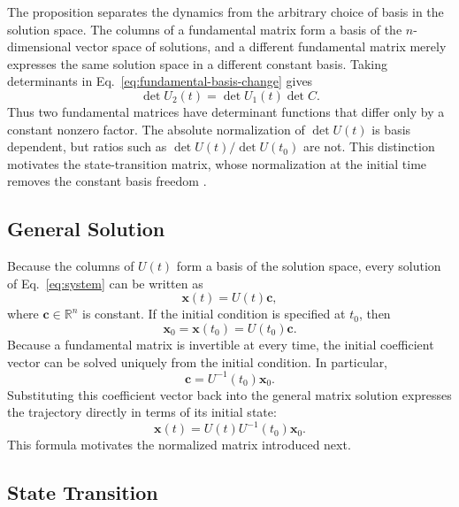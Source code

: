 \documentclass[11pt,a4paper]{article}
\newcommand{\be}{\begin{equation}}
\newcommand{\ee}{\end{equation}}
\newcommand{\lb}[1]{\label{#1}}
\newcommand{\R}{\mathbb{R}}
\theoremstyle{definition}
\numberwithin{equation}{section}
\begin{document}
The proposition separates the dynamics from the arbitrary choice of basis in the solution space. The columns of a fundamental matrix form a basis of the $n$-dimensional vector space of solutions, and a different fundamental matrix merely expresses the same solution space in a different constant basis. Taking determinants in Eq.~\eqref{eq:fundamental-basis-change} gives
\be
\det U_2(t)=\det U_1(t)\det C.
\lb{eq:fundamental-determinant-normalization}
\ee
Thus two fundamental matrices have determinant functions that differ only by a constant nonzero factor. The absolute normalization of $\det U(t)$ is basis dependent, but ratios such as $\det U(t)/\det U(t_0)$ are not. This distinction motivates the state-transition matrix, whose normalization at the initial time removes the constant basis freedom \cite{coddington1955,teschl2012}.

\subsection{General Solution}

Because the columns of $U(t)$ form a basis of the solution space, every solution of Eq.~\eqref{eq:system} can be written as
\be
\mathbf{x}(t)=U(t)\mathbf{c},
\lb{eq:general-solution}
\ee
where $\mathbf{c}\in\R^n$ is constant. If the initial condition is specified at $t_0$, then
\be
\mathbf{x}_0=\mathbf{x}(t_0)=U(t_0)\mathbf{c}.
\lb{eq:initial-c}
\ee
Because a fundamental matrix is invertible at every time, the initial coefficient vector can be solved uniquely from the initial condition. In particular,
\be
\mathbf{c}=U^{-1}(t_0)\mathbf{x}_0.
\lb{eq:c-solution}
\ee
Substituting this coefficient vector back into the general matrix solution expresses the trajectory directly in terms of its initial state:
\be
\mathbf{x}(t)=U(t)U^{-1}(t_0)\mathbf{x}_0.
\lb{eq:state-transition-solution}
\ee
This formula motivates the normalized matrix introduced next.

\subsection{State Transition}
\end{document}
